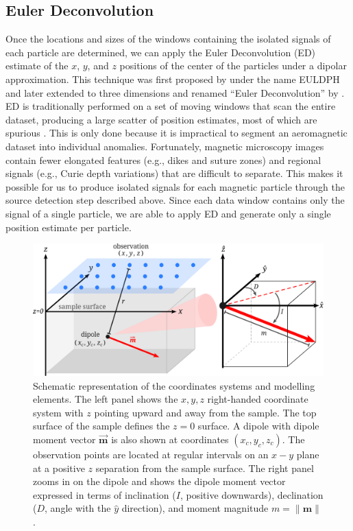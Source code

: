 \subsection{Euler Deconvolution}

Once the locations and sizes of the windows containing the isolated signals of
each particle are determined, we can apply the Euler Deconvolution (ED)
estimate of the $x$, $y$, and $z$ positions of the center of the particles
under a dipolar approximation. This technique was first proposed by
\citet{Thompson1982} under the name EULDPH and later extended to three
dimensions and renamed ``Euler Deconvolution'' by \citet{Reid1990}. ED is
traditionally performed on a set of moving windows that scan the entire
dataset, producing a large scatter of position estimates, most of which are
spurious \citep{Silva20033D}. This is only done because it is impractical to
segment an aeromagnetic dataset into individual anomalies. Fortunately,
magnetic microscopy images contain fewer elongated features (e.g., dikes and
suture zones) and regional signals (e.g., Curie depth variations) that are
difficult to separate. This makes it possible for us to produce isolated
signals for each magnetic particle through the source detection step described
above. Since each data window contains only the signal of a single particle, we
are able to apply ED and generate only a single position estimate per particle.

\begin{figure}[tb]
\centering
\includegraphics[width=\linewidth]{figures/coordinate-system-sketch.png}
\caption{
Schematic representation of the coordinates systems and modelling elements.
The left panel shows the $x, y, z$ right-handed coordinate system with $z$
pointing upward and away from the sample. The top surface of the sample defines
the $z=0$ surface. A dipole with dipole moment vector $\mathbf{\vec{m}}$ is
also shown at coordinates $(x_c, y_c, z_c)$. The observation points are located
at regular intervals on an $x-y$ plane at a positive $z$ separation from the
sample surface. The right panel zooms in on the dipole and shows the dipole
moment vector expressed in terms of inclination ($I$, positive downwards),
declination ($D$, angle with the $\hat{y}$ direction), and moment magnitude $m
= \|\mathbf{m}\|$.
}
\label{fig_coordinate_systems}
\end{figure}

